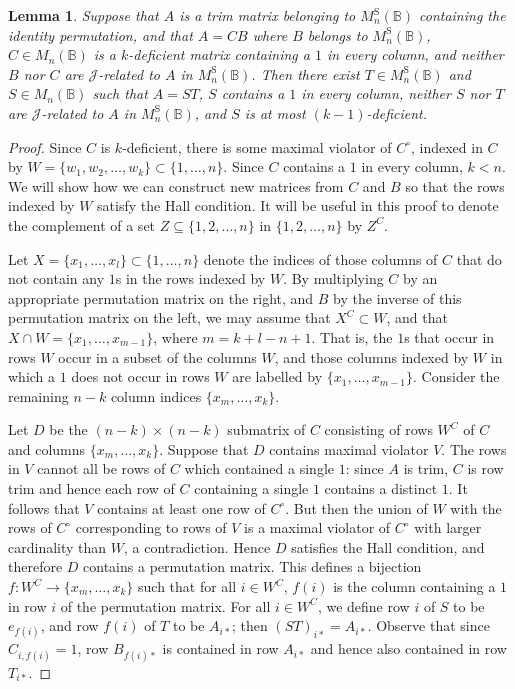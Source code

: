 \documentclass[11pt]{article}
\newtheorem{lemma}[thm]{Lemma}
\numberwithin{equation}{section}
\renewcommand{\to}{\longrightarrow}
\newcommand{\B}{\mathbb{B}}
\newcommand{\Bn}{M_n(\B)}
\newcommand{\Halln}{M_n^{\text{S}}(\B)}
\newcommand{\J}{\mathscr{J}}
\begin{document}
\begin{lemma}
  Suppose that $A$ is a trim matrix belonging to $\Halln$ containing the
  identity permutation, and that $A = CB$ where $B$ belongs to $\Halln$, $C
  \in \Bn$ is a $k$-deficient matrix containing a $1$ in every column, and
  neither $B$ nor $C$ are $\J$-related to $A$ in $\Halln$. Then there exist $T
  \in \Halln$ and $S \in \Bn$ such that $A = ST$, $S$ contains a $1$ in
  every column, neither $S$ nor $T$ are $\J$-related to $A$ in $\Halln$, and
  $S$ is at most $(k-1)$-deficient.
\end{lemma}
\begin{proof}
  Since $C$ is $k$-deficient, there is some maximal violator of $C^\circ$,
  indexed in $C$ by $W  = \{w_1, w_2, \ldots, w_k\} \subset \{1, \ldots, n\}$.
  Since $C$ contains a $1$ in every column, $k < n$. We will show how we can
  construct new matrices from $C$ and $B$ so that the rows indexed by $W$
  satisfy the Hall condition. It will be useful in this proof to denote the
  complement of a set $Z \subseteq \{1, 2, \ldots, n\}$ in $\{1, 2, \ldots, n\}$
  by $Z^C$.

  Let $X = \{x_1, \ldots, x_l\} \subset \{1, \ldots, n\}$ denote the indices of
  those columns of $C$ that do not contain any $1$s in the rows indexed by $W$.
  By multiplying $C$ by an appropriate permutation matrix on the right, and $B$
  by the inverse of this permutation matrix on the left, we may assume that $X^C
  \subset W$, and that $X \cap W = \{x_1, \ldots, x_{m - 1}\}$, where $m = k + l
  - n + 1$. That is, the $1$s that occur in rows $W$ occur in a subset of the
  columns $W$, and those columns indexed by $W$ in which a $1$ does not occur in
  rows $W$ are labelled by $\{x_1, \ldots, x_{m - 1}\}$. Consider the remaining
  $n - k$ column indices $\{x_m, \ldots, x_k\}$. 
    
  Let $D$ be the $(n-k) \times (n-k)$ submatrix of $C$ consisting of rows $W^C$
  of $C$ and columns $\{x_m, \ldots, x_k\}$. Suppose that $D$ contains maximal
  violator $V$. The rows in $V$ cannot all be rows of $C$ which contained a
  single $1$: since $A$ is trim, $C$ is row trim and hence each row of $C$
  containing a single $1$ contains a distinct $1$.  It follows that $V$ contains
  at least one row of $C^\circ$. But then the union of $W$ with the rows of
  $C^\circ$ corresponding to rows of $V$ is a maximal violator of $C^\circ$ with
  larger cardinality than $W$, a contradiction. Hence $D$ satisfies the Hall
  condition, and therefore $D$ contains a permutation matrix. This defines a
  bijection $f: W^C \to \{x_m, \ldots, x_k\}$ such that for all $i \in W^C$,
  $f(i)$ is the column containing a $1$ in row $i$ of the permutation matrix.
  For all $i \in W^C$, we define row $i$ of $S$ to be $e_{f(i)}$, and row $f(i)$
  of $T$ to be $A_{i*}$; then $(ST)_{i*} = A_{i*}$. Observe that since
  $C_{i,f(i)} = 1$, row $B_{f(i)*}$ is contained in row $A_{i*}$ and hence also
  contained in row $T_{i*}$.


\end{proof}
\end{document}
